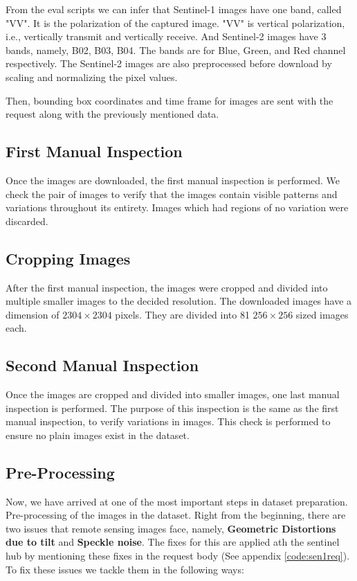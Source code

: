 From the eval scripts we can infer that Sentinel-1 images have one band, called "VV". It is the polarization of the captured image. "VV" is vertical polarization, i.e.,  vertically transmit and vertically receive. And Sentinel-2 images have 3 bands, namely, B02, B03, B04. The bands are for Blue, Green, and Red channel respectively. The Sentinel-2 images are also preprocessed before download by scaling and normalizing the pixel values. 

Then, bounding box coordinates and time frame for images are sent with the request along with the previously mentioned data.

\subsection{First Manual Inspection}

Once the images are downloaded, the first manual inspection is performed. We check the pair of images to verify that the images contain visible patterns and variations throughout its entirety. Images which had regions of no variation were discarded.

\subsection{Cropping Images}

After the first manual inspection, the images were cropped and divided into multiple smaller images to the decided resolution. The downloaded images have a dimension of $2304\times2304$ pixels. They are divided into 81 $256\times256$ sized images each.

\subsection{Second Manual Inspection}

Once the images are cropped and divided into smaller images, one last manual inspection is performed. The purpose of this inspection is the same as the first manual inspection, to verify variations in images. This check is performed to ensure no plain images exist in the dataset.

\subsection{Pre-Processing}

Now, we have arrived at one of the most important steps in dataset preparation. Pre-processing of the images in the dataset. Right from the beginning, there are two issues that remote sensing images face, namely, \textbf{Geometric Distortions due to tilt} and \textbf{Speckle noise}. The fixes for this are applied ath the sentinel hub by mentioning these fixes in the request body (See appendix \ref{code:sen1req}). To fix these issues we tackle them in the following ways:


